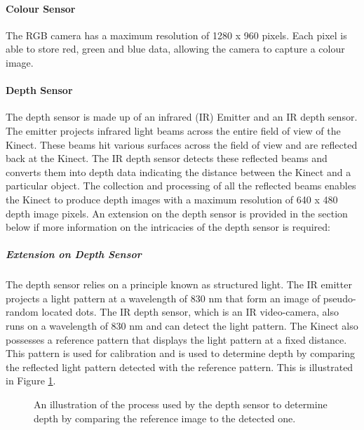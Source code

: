 \paragraph{Colour Sensor}
The RGB camera has a maximum resolution of 1280 x 960 pixels. Each pixel is able to store red, green and blue data, allowing the camera to capture a colour image. \cite{msdnKinectSpecs2017}

\paragraph{Depth Sensor}
The depth sensor is made up of an infrared (IR) Emitter and an IR depth sensor. The emitter projects infrared light beams across the entire field of view of the Kinect. These beams hit various surfaces across the field of view and are reflected back at the Kinect. The IR depth sensor detects these reflected beams and converts them into depth data indicating the distance between the Kinect and a particular object. The collection and processing of all the reflected beams enables the Kinect to produce depth images with a maximum resolution of 640 x 480 depth image pixels. \cite{msdnKinectSpecs2017} An extension on the depth sensor is provided in the section below if more information on the intricacies of the depth sensor is required:

\subparagraph{Extension on Depth Sensor}
The depth sensor relies on a principle known as structured light. The IR emitter projects a light pattern at a wavelength of 830 nm that form an image of pseudo-random located dots. The IR depth sensor, which is an IR video-camera, also runs on a wavelength of 830 nm and can detect the light pattern. The Kinect also possesses a reference pattern that displays the light pattern at a fixed distance. This pattern is used for calibration and is used to determine depth by comparing the reflected light pattern detected with the reference pattern. \cite{kinectComp2011} This is illustrated in Figure \ref{fig:depthRefPattern}.

\begin{figure}[ht]
	\centering
	{%
		\setlength{\fboxsep}{0pt}%
		\setlength{\fboxrule}{0.5pt}%
		}
	\caption{An illustration of the process used by the depth sensor to determine depth by comparing the reference image to the detected one. \cite{kinectComp2011}}
	\label{fig:depthRefPattern}
\end{figure}

